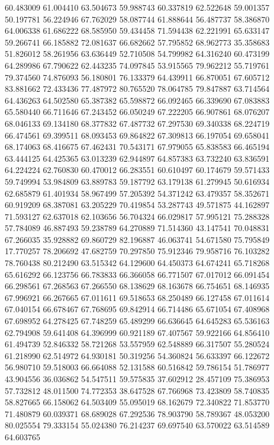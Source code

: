 60.483009
61.004410
63.504673
59.988743
60.337819
62.522648
59.001357
50.197781
56.224946
67.762029
58.087744
61.888644
56.487737
58.386870
64.006338
61.686222
68.585950
59.434458
71.594438
62.221991
65.633147
59.266741
66.185882
72.081637
66.682662
57.795852
68.962773
35.358683
51.826012
58.261956
63.636449
52.710508
54.799982
64.316240
60.473199
64.289986
67.790622
62.443235
74.097845
53.915565
79.962212
55.719761
79.374560
74.876093
56.180801
76.133379
64.439911
66.870051
67.605712
83.881662
72.433436
77.487972
80.765520
78.064785
79.847887
63.714564
64.436263
64.502580
65.387382
65.598872
66.092465
66.339690
67.083883
65.580440
66.711646
67.243452
66.050249
67.222205
66.907861
68.076207
68.046133
69.134180
68.377832
67.487732
67.297530
69.340338
68.224719
66.474561
69.399511
68.093453
69.864822
67.309813
66.197054
69.658041
68.174063
68.416675
67.462431
70.543171
67.979055
65.838583
66.465194
63.444125
64.425365
63.013239
62.944897
64.857383
63.732240
63.836591
64.224224
62.760830
60.470012
66.283551
60.610497
60.174679
59.571433
59.749994
53.984809
63.889783
59.187792
63.179138
61.279945
50.616934
62.685879
61.401934
58.967499
57.205392
54.371242
63.479357
58.352671
60.919209
68.387081
63.205229
70.419854
53.287743
49.571875
44.162897
71.593127
62.637018
62.103656
56.704324
66.029817
57.995121
75.288328
57.784089
46.887493
59.238789
64.270889
71.514360
43.147541
70.048831
67.266035
35.928882
69.860729
82.196887
46.063741
54.671580
75.795849
17.770257
78.206692
47.682759
70.297850
75.912346
79.958716
76.103282
78.760438
80.212490
63.515342
64.129600
64.450373
64.674241
65.718268
65.616292
66.123756
66.783833
66.366058
66.771507
67.017012
66.091454
66.298561
67.268563
67.266550
68.138629
68.163678
66.754651
68.146935
67.996921
66.267665
67.011611
69.518653
68.250489
66.127458
67.011614
67.040154
66.678467
67.768695
69.842914
66.714486
65.671054
67.408968
67.698952
64.278425
67.748259
65.489299
66.636645
64.645283
65.536163
62.794908
59.641408
64.396999
60.921189
67.407567
59.922166
64.856410
61.494739
52.846332
58.721268
53.557959
62.548889
66.317507
55.280524
61.218990
62.514972
64.930181
50.319256
54.360824
56.633397
66.122672
56.980710
59.518003
66.664088
52.131588
60.516842
59.786154
51.786977
43.904556
36.036862
54.547511
59.575835
37.602912
28.457109
75.386953
57.732812
48.011500
74.772353
38.647528
67.766968
73.423809
58.740835
58.827665
66.158062
64.503409
55.095019
68.162679
72.340822
71.853770
71.480879
60.039371
68.689028
67.292536
78.903790
58.789367
48.053200
80.025554
79.333154
55.024380
76.214237
69.697540
63.570022
63.514589
64.603765
